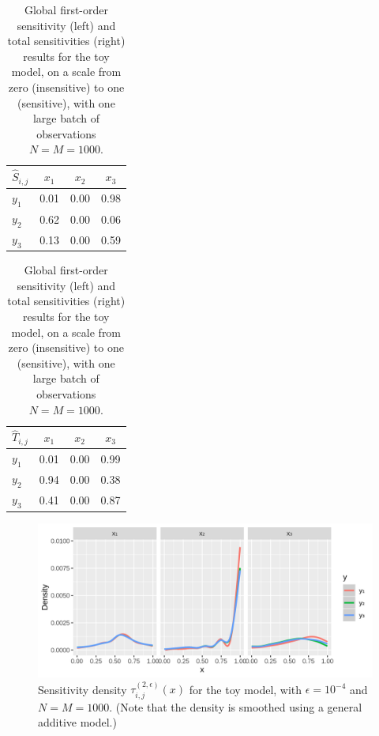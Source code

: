 \documentclass[12pt]{article}
\begin{document}
\begin{table}
\centering
\begin{tabular}{l|c|c|c}
$\hat{S}_{i,j}$ & $x_1$ & $x_2$ & $x_3$ \\
\hline
$y_1$ & 0.01 & 0.00 & 0.98 \\
$y_2$ & 0.62 & 0.00 & 0.06 \\
$y_3$ & 0.13 & 0.00 & 0.59 \\
\end{tabular}
\quad
\begin{tabular}{l|c|c|c}
$\hat{T}_{i,j}$ & $x_1$ & $x_2$ & $x_3$ \\
\hline
$y_1$ & 0.01 & 0.00 & 0.99 \\
$y_2$ & 0.94 & 0.00 & 0.38 \\
$y_3$ & 0.41 & 0.00 & 0.87 \\
\end{tabular}
\caption{Global first-order sensitivity (left) and total sensitivities (right) results for the toy model, on a scale from zero (insensitive) to one (sensitive), with one large batch of observations $N = M = 1000$.}
\label{tab:toyglobal}
\end{table}

\begin{figure}
    \centering
    \includegraphics[width=1.00\linewidth]{figures/toy-tau.png}
    \caption{Sensitivity density $\tau_{i,j}^{(2,\epsilon)}(x)$ for the toy model, with $\epsilon = 10^{-4}$ and $N = M = 1000$. (Note that the density is smoothed using a general additive model.)}
    \label{fig:toy-tau}
\end{figure}
\end{document}
